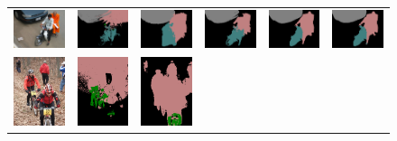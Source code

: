 \begin{figure}[!htbp]
{\begin{tabular}{c c c c c c}
    \includegraphics[height=0.122\linewidth]{fig/val_crf_vis/img/2011_002322.jpg} &
    \includegraphics[height=0.122\linewidth]{fig/val_crf_vis/adaweak/2011_002322.png} &
    \includegraphics[height=0.122\linewidth]{fig/val_crf_vis/bbox/2011_002322.png} &
    \includegraphics[height=0.122\linewidth]{fig/val_crf_vis/bbox_crf/2011_002322.png} &
    \includegraphics[height=0.122\linewidth]{fig/val_crf_vis/strongweak/2011_002322.png} &
    \includegraphics[height=0.122\linewidth]{fig/val_crf_vis/cocomix/2011_002322.png} \\
    \includegraphics[height=0.13\linewidth]{fig/val_crf_vis/img/2007_001630.jpg} &
    \includegraphics[height=0.13\linewidth]{fig/val_crf_vis/adaweak/2007_001630.png} &
    \includegraphics[height=0.13\linewidth]{fig/val_crf_vis/bbox/2007_001630.png} &

\end{tabular}}
\end{figure}
